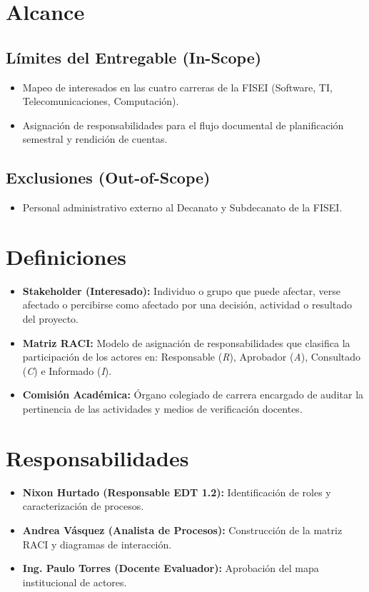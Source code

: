 \documentclass[12pt,a4paper]{article}
\begin{document}
\section{Alcance}
\subsection{Límites del Entregable (In-Scope)}
\begin{itemize}[leftmargin=1.5em, itemsep=2pt]
    \item Mapeo de interesados en las cuatro carreras de la FISEI (Software, TI, Telecomunicaciones, Computación).
    \item Asignación de responsabilidades para el flujo documental de planificación semestral y rendición de cuentas.
\end{itemize}
\subsection{Exclusiones (Out-of-Scope)}
\begin{itemize}[leftmargin=1.5em, itemsep=2pt]
    \item Personal administrativo externo al Decanato y Subdecanato de la FISEI.
\end{itemize}

\section{Definiciones}
\begin{itemize}[leftmargin=1.5em, itemsep=2pt]
    \item \textbf{Stakeholder (Interesado):} Individuo o grupo que puede afectar, verse afectado o percibirse como afectado por una decisión, actividad o resultado del proyecto.
    \item \textbf{Matriz RACI:} Modelo de asignación de responsabilidades que clasifica la participación de los actores en: Responsable (\textit{R}), Aprobador (\textit{A}), Consultado (\textit{C}) e Informado (\textit{I}).
    \item \textbf{Comisión Académica:} Órgano colegiado de carrera encargado de auditar la pertinencia de las actividades y medios de verificación docentes.
\end{itemize}

\section{Responsabilidades}
\begin{itemize}[leftmargin=1.5em, itemsep=2pt]
    \item \textbf{Nixon Hurtado (Responsable EDT 1.2):} Identificación de roles y caracterización de procesos.
    \item \textbf{Andrea Vásquez (Analista de Procesos):} Construcción de la matriz RACI y diagramas de interacción.
    \item \textbf{Ing. Paulo Torres (Docente Evaluador):} Aprobación del mapa institucional de actores.
\end{itemize}
\end{document}
